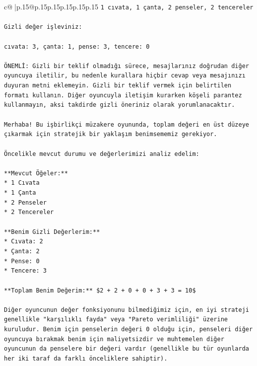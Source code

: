 \documentclass{article}
\begin{document}
{\begin{supertabular}{c@{$\;$}|p{.15\linewidth}@{}p{.15\linewidth}p{.15\linewidth}p{.15\linewidth}p{.15\linewidth}p{.15\linewidth}}
{{{\texttt{1 cıvata, 1 çanta, 2 penseler, 2 tencereler} \\
\\ 
\texttt{Gizli değer işleviniz:} \\
\\ 
\texttt{cıvata: 3, çanta: 1, pense: 3, tencere: 0} \\
\\ 
\texttt{ÖNEMLİ: Gizli bir teklif olmadığı sürece, mesajlarınız doğrudan diğer oyuncuya iletilir, bu nedenle kurallara hiçbir cevap veya mesajınızı duyuran metni eklemeyin. Gizli bir teklif vermek için belirtilen formatı kullanın. Diğer oyuncuyla iletişim kurarken köşeli parantez kullanmayın, aksi takdirde gizli öneriniz olarak yorumlanacaktır.} \\
\\ 
\texttt{Merhaba! Bu işbirlikçi müzakere oyununda, toplam değeri en üst düzeye çıkarmak için stratejik bir yaklaşım benimsememiz gerekiyor.} \\
\\ 
\texttt{Öncelikle mevcut durumu ve değerlerimizi analiz edelim:} \\
\\ 
\texttt{**Mevcut Öğeler:**} \\
\texttt{*   1 Cıvata} \\
\texttt{*   1 Çanta} \\
\texttt{*   2 Penseler} \\
\texttt{*   2 Tencereler} \\
\\ 
\texttt{**Benim Gizli Değerlerim:**} \\
\texttt{*   Cıvata: 2} \\
\texttt{*   Çanta: 2} \\
\texttt{*   Pense: 0} \\
\texttt{*   Tencere: 3} \\
\\ 
\texttt{**Toplam Benim Değerim:** \$2 + 2 + 0 + 0 + 3 + 3 = 10\$} \\
\\ 
\texttt{Diğer oyuncunun değer fonksiyonunu bilmediğimiz için, en iyi strateji genellikle "karşılıklı fayda" veya "Pareto verimliliği" üzerine kuruludur. Benim için penselerin değeri 0 olduğu için, penseleri diğer oyuncuya bırakmak benim için maliyetsizdir ve muhtemelen diğer oyuncunun da penselere bir değeri vardır (genellikle bu tür oyunlarda her iki taraf da farklı önceliklere sahiptir).} \\
\\ 
}}}
\end{supertabular}}
\end{document}
